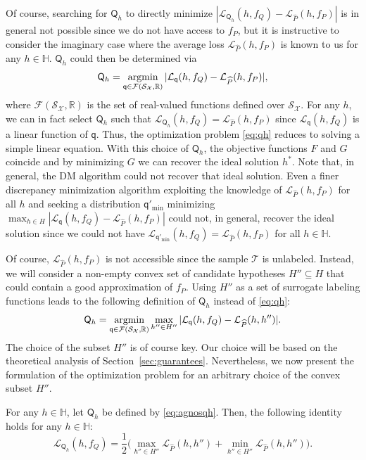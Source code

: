 \documentclass[twoside,11pt]{article}
\def\Rset{\mathbb{R}}
\def\Hset{\mathbb{H}}
\DeclareMathOperator*{\argmin}{\rm argmin}
\newcommand{\h}{\widehat}
\newcommand{\cF}{{\mathcal F}}
\newcommand{\cL}{{\mathcal L}}
\newcommand{\cS}{{\mathcal S}}
\newcommand{\cT}{{\mathcal T}}
\newcommand{\cX}{{\mathcal X}}
\newcommand{\1}{\mat{1}}
\newcommand{\qq}{{\mathsf q}}
\newcommand{\QQ}{{\mathsf Q}}
\begin{document}
Of course, searching for $\QQ_h$ to directly minimize
$|\cL_{\QQ_h}(h, f_Q) - \cL_{\h P}(h, f_P)|$ is in general not
possible since we do not have access to $f_P$, but it is instructive
to consider the imaginary case where the average loss
$\cL_{\h P}(h, f_P)$ is known to us for any $h \in \Hset$.
$\QQ_h$ could then be determined via
\begin{equation}
\label{eq:qh}
\QQ_h = \argmin_{\qq \in \cF(\cS_\cX, \Rset)} | \cL_\qq(h, f_Q) - \cL_{\h P}(h, f_P)|,
\end{equation}
where $\cF(\cS_\cX, \Rset)$ is the set of real-valued functions defined
over $\cS_\cX$. For any $h$, we can in fact select $\QQ_h$ such that
$\cL_{\QQ_h}(h, f_Q) = \cL_{\h P}(h, f_P)$ since $\cL_\qq(h, f_Q)$ is
a linear function of $\qq$. Thus, the optimization problem
\eqref{eq:qh} reduces to solving a simple linear equation. With this
choice of $\QQ_h$, the objective functions $F$ and $G$ coincide and by
minimizing $G$ we can recover the ideal solution $h^*$.  Note that, in
general, the DM algorithm could not recover that ideal solution. Even
a finer discrepancy minimization algorithm exploiting the knowledge of
$ \cL_{\h P}(h, f_P)$ for all $h$ and seeking a distribution
$\qq'_\text{min}$ minimizing
$\max_{h \in H} | \cL_\qq(h, f_Q) -\cL_{\h P}(h, f_P)|$ could not, in
general, recover the ideal solution since we could not have
$\cL_{\qq'_\text{min}}(h, f_Q) = \cL_{\h P}(h, f_P)$ for all
$h \in \Hset$.

Of course, $\cL_{\h P}(h, f_P)$ is not accessible since the sample
$\cT$ is unlabeled. Instead, we will consider a non-empty convex set
of candidate hypotheses $H'' \subseteq H$ that could contain a good
approximation of $f_P$. Using $H''$ as a set of surrogate labeling
functions leads to the following definition of $\QQ_h$ instead of
\eqref{eq:qh}:
\begin{equation}
\label{eq:agnosqh}
\QQ_h = \argmin_{\qq \in \cF(\cS_\cX, \Rset)} \max_{h'' \in H''}|
\cL_\qq(h, f_Q) - \cL_{\h P}(h, h'') |.
\end{equation}
The choice of the subset $H''$ is of course key. Our choice will be
based on the theoretical analysis of
Section~\ref{sec:guarantees}. Nevertheless, we now
present the formulation of the optimization problem for an
arbitrary choice of the convex subset $H''$.

\begin{proposition}
\label{prop:maxmin}
For any $h \in \Hset$, let $\QQ_h$ be defined by \eqref{eq:agnosqh}.
Then, the following identity holds for any $h \in \Hset$:
\begin{equation*}
  \cL_{\QQ_h}(h, f_Q) = \frac{1}{2} \Big(\max_{h'' \in H''} \cL_{\h
    P}(h, h'') + \min_{h'' \in H''}\cL_{\h P}(h, h'') \Big).
\end{equation*}
\end{proposition}
\end{document}
